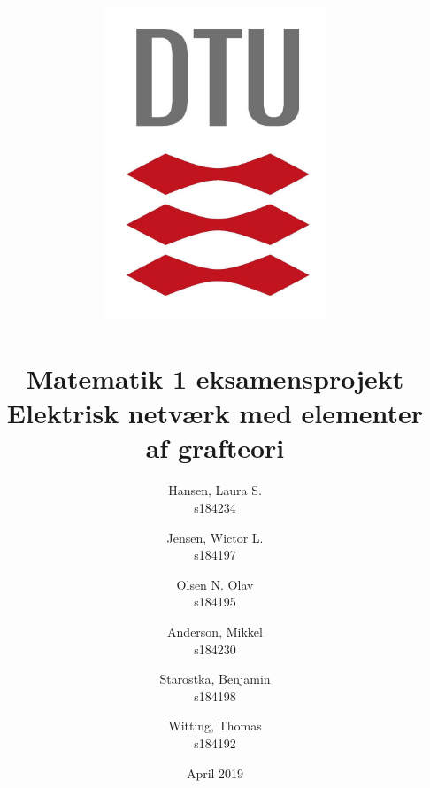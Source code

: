 \begin{titlepage}
  
\author{Hansen, Laura S.\\s184234 \and Jensen, Wictor L.\\s184197 \and Olsen N. Olav\\s184195
\and Anderson, Mikkel\\s184230 \and Starostka, Benjamin\\s184198 \and Witting, Thomas\\s184192}
\date{April 2019}

\title{
\includegraphics[width=0.5\textwidth]{images/dtuLogo.jpg}\\
[10mm]   \HRule \\[0.2cm]
\textbf{Matematik 1 eksamensprojekt} \\
\large Elektrisk netværk med elementer af grafteori
  \HRule
}

\maketitle
\end{titlepage}
